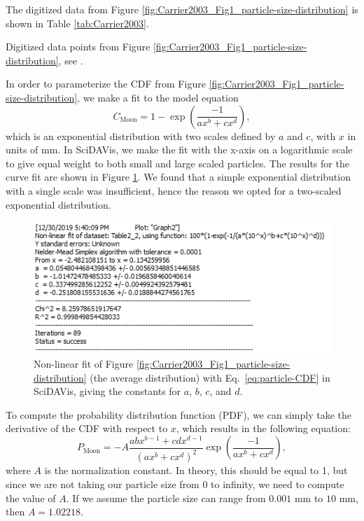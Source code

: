 \documentclass{hitec}
\numberwithin{equation}{section}
\begin{document}
The digitized data from Figure \ref{fig:Carrier2003_Fig1_particle-size-distribution} is shown in Table \ref{tab:Carrier2003}.

\begin{table}
	\centering
	\caption{Digitized data points from Figure \ref{fig:Carrier2003_Fig1_particle-size-distribution}, see \cite{carrier2003particle}.}\label{tab:Carrier2003}
\end{table}



In order to parameterize the CDF from Figure \ref{fig:Carrier2003_Fig1_particle-size-distribution}, we make a fit to the model equation
\begin{equation}\label{eq:particle-CDF}
C_{\text{Moon}} = 1 - \exp\left(\frac{-1}{ax^b+cx^d}\right),
\end{equation}
which is an exponential distribution with two scales defined by $a$ and $c$, with $x$ in units of mm. In \textsf{SciDAVis}, we make the fit with the x-axis on a logarithmic scale to give equal weight to both small and large scaled particles. The results for the curve fit are shown in Figure \ref{fig:Fit-to-CDF}. We found that a simple exponential distribution with a single scale was insufficient, hence the reason we opted for a two-scaled exponential distribution.

\begin{figure}[h!]
	\centering
	\includegraphics[scale=1]{Fit-to-CDF.PNG}
	\caption{Non-linear fit of Figure \ref{fig:Carrier2003_Fig1_particle-size-distribution} (the average distribution) with Eq.\ \ref{eq:particle-CDF} in \textsf{SciDAVis}, giving the constants for $a$, $b$, $c$, and $d$.}\label{fig:Fit-to-CDF}
\end{figure}

To compute the probability distribution function (PDF), we can simply take the derivative of the CDF with respect to $x$, which results in the following equation:
\begin{equation}
P_{\text{Moon}} = -A\frac{abx^{b-1}+cdx^{d-1}}{(ax^b+cx^d)^2}\exp\left(\frac{-1}{ax^b+cx^d}\right),
\end{equation}
where $A$ is the normalization constant. In theory, this should be equal to 1, but since we are not taking our particle size from 0 to infinity, we need to compute the value of $A$. If we assume the particle size can range from $0.001$ mm to $10$ mm, then $A = 1.02218$.
\end{document}
